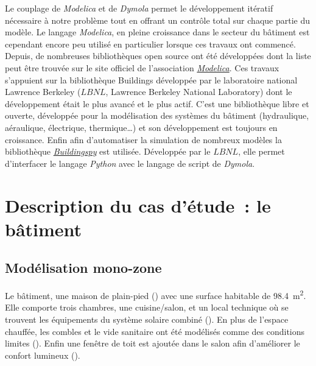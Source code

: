 Le couplage de \textit{Modelica} et de \textit{Dymola} permet le développement itératif
nécessaire à notre problème tout en offrant un contrôle total sur chaque partie du modèle.
Le langage \textit{Modelica}, en pleine croissance dans le secteur du bâtiment est cependant
encore peu utilisé en particulier lorsque ces travaux ont commencé. Depuis, de nombreuses
bibliothèques open source ont été développées dont la liste peut être trouvée sur le site
officiel de l’association \href{https://www.modelica.org/libraries}{\textit{Modelica}}. Ces
travaux s’appuient sur la bibliothèque Buildings \parencite{Wetter2014253} développée par le laboratoire
national Lawrence Berkeley ($LBNL$, Lawrence Berkeley National Laboratory) dont le
développement était le plus avancé et le plus actif. C’est une bibliothèque libre et
ouverte, développée pour la modélisation des systèmes du bâtiment (hydraulique,
aéraulique, électrique, thermique\dots) et son développement est toujours en croissance. Enfin
afin d’automatiser la simulation de nombreux modèles la bibliothèque
\href{http://simulationresearch.lbl.gov/modelica/buildingspy/}{\textit{Buildingspy}}
est utilisée. Développée par le $LBNL$, elle permet d’interfacer le langage \textit{Python}
avec le langage de script de \textit{Dymola}.




\section{Description du cas d’étude~: le bâtiment} %
\label{sec:description_du_cas_d_etude_le_batiment}
\subsection{Modélisation mono-zone} %
\label{sub:modelisation_monozone}
Le bâtiment, une maison de plain-pied () avec une surface habitable
de \SI{98.4}{\meter\squared}. Elle comporte trois chambres, une cuisine/salon, et un local
technique où se trouvent les équipements du système solaire combiné (). En plus de
l’espace chauffée, les combles et le vide sanitaire ont été modélisés comme des conditions
limites (). Enfin une fenêtre de toit est ajoutée dans
le salon afin d’améliorer le confort lumineux ().

